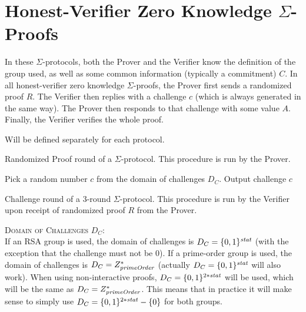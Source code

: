\section{Honest-Verifier Zero Knowledge $\Sigma$-Proofs}

In these $\Sigma$-protocols, both the Prover and the Verifier know the definition of the group used, as well as some common information (typically a commitment) $C$. In all honest-verifier zero knowledge $\Sigma$-proofs, the Prover first sends a randomized proof $R$. The Verifier then replies with a challenge $c$ (which is always generated in the same way). The Prover then responds to that challenge with some value $A$. Finally, the Verifier verifies the whole proof.


\begin{algorithm}[H]\label{randProofHV}
\dontprintsemicolon

\BlankLine

 \;
\Indp
  Will be defined separately for each protocol.
\Indm

\caption{Randomized Proof round of a $\Sigma$-protocol. This procedure is run by the Prover.}
\end{algorithm}



\begin{algorithm}[H]\label{challengeHV}
\dontprintsemicolon

\BlankLine

 \;
\Indp
  Pick a random number $c$ from the domain of challenges $D_C$. \;
  Output challenge $c$ \;
\Indm

\caption{Challenge round of a 3-round $\Sigma$-protocol. This procedure is run by the Verifier upon receipt of randomized proof $R$ from the Prover.}
\end{algorithm}


\textsc{Domain of Challenges $D_C$}:\\
If an RSA group is used, the domain of challenges is $D_C = \{0,1\}^{\mathit{stat}}$ (with the exception that the challenge must not be $0$). If a prime-order group is used, the domain of challenges is $D_C = Z_{\mathit{primeOrder}}^*$ (actually $D_C = \{0,1\}^{\mathit{stat}}$ will also work). When using non-interactive proofs, $D_C = \{0,1\}^{2*\mathit{stat}}$ will be used, which will be the same as $D_C = Z_{\mathit{primeOrder}}^*$. This means that in practice it will make sense to simply use $D_C = \{0,1\}^{2*\mathit{stat}} - \{0\}$ for both groups.



